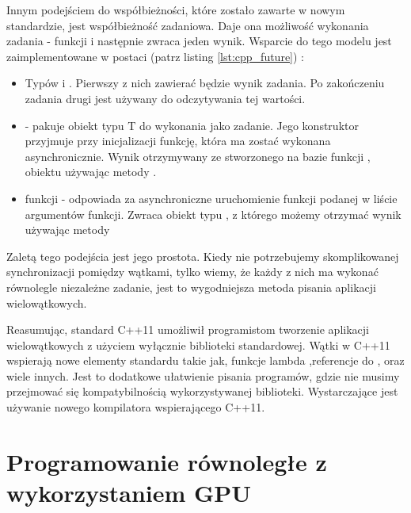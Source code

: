 \documentclass[document.tex]{subfiles}
\begin{document}
\indent Innym podejściem do współbieżności, które zostało zawarte w nowym standardzie,
jest współbieżność zadaniowa. Daje ona możliwość wykonania zadania - funkcji i  następnie zwraca
jeden wynik. Wsparcie do tego modelu jest zaimplementowane w postaci\cite{C++_ref}\cite{C++_Meyers}
(patrz listing \ref{lst:cpp_future}) :
\begin{itemize}
\item Typów  i . Pierwszy z nich zawierać będzie wynik 
zadania. Po zakończeniu zadania drugi jest używany do odczytywania tej wartości. 
\item {} - pakuje obiekt typu T do wykonania jako zadanie. Jego konstruktor
przyjmuje przy inicjalizacji funkcję, która ma zostać wykonana asynchronicznie. Wynik otrzymywany ze
stworzonego na bazie funkcji , obiektu  używając metody .
\item funkcji  - odpowiada za asynchroniczne uruchomienie funkcji podanej w liście argumentów funkcji. 
Zwraca obiekt typu , z którego możemy otrzymać wynik używając metody 
\end{itemize}


 
Zaletą tego podejścia jest jego prostota. Kiedy nie potrzebujemy skomplikowanej synchronizacji pomiędzy wątkami,
tylko wiemy, że każdy z nich ma wykonać równolegle niezależne zadanie, jest to wygodniejsza
 metoda pisania aplikacji wielowątkowych. 
\cite{C++_Meyers}\cite{C++_Stroustrup}

\indent Reasumując, standard C++11 umożliwił programistom tworzenie 
aplikacji wielowątkowych z użyciem wyłącznie biblioteki standardowej.
Wątki w C++11 wspierają nowe elementy standardu takie jak, 
funkcje lambda ,referencje do ,  oraz wiele innych. Jest to dodatkowe ułatwienie pisania programów, gdzie nie musimy
przejmować się kompatybilnością wykorzystywanej biblioteki. Wystarczające 
jest używanie nowego kompilatora wspierającego C++11. 




\section{Programowanie równoległe z wykorzystaniem GPU}
\end{document}
